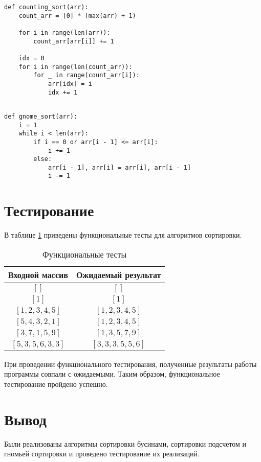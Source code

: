 \begin{center}
\captionsetup{justification=raggedright,singlelinecheck=off}
\begin{lstlisting}[label=lst:counting_sort,caption=Алгоритм сортировки подсчетом]
def counting_sort(arr):
	count_arr = [0] * (max(arr) + 1)
	
	for i in range(len(arr)):
		count_arr[arr[i]] += 1
	
	idx = 0
	for i in range(len(count_arr)):
		for _ in range(count_arr[i]):
			arr[idx] = i
			idx += 1
	    
\end{lstlisting}
\end{center}
\clearpage
\begin{center}
\captionsetup{justification=raggedright,singlelinecheck=off}
\begin{lstlisting}[label=lst:gnome_sort,caption=Алгоритм гномьей сортировки]
def gnome_sort(arr):
	i = 1
	while i < len(arr):
		if i == 0 or arr[i - 1] <= arr[i]:
			i += 1
		else:
			arr[i - 1], arr[i] = arr[i], arr[i - 1]
			i -= 1

\end{lstlisting}
\end{center}

\section{Тестирование}

В таблице \ref{tbl:tests} приведены функциональные тесты для алгоритмов сортировки.

\begin{table}[h]
	\begin{center}
		\caption{\label{tbl:tests} Функциональные тесты}
		\begin{tabular}{|c|c|}
			\hline
			Входной массив & Ожидаемый результат \\ 
			\hline
			$[]$ & $[]$\\ \hline
			$[1]$ & $[1]$\\ \hline
			$[1, 2, 3, 4, 5]$ & $[1, 2, 3, 4, 5]$\\ \hline
			$[5, 4, 3, 2, 1]$ & $[1, 2, 3, 4, 5]$\\ \hline
			$[3, 7, 1, 5, 9]$ & $[1, 3, 5, 7, 9]$\\ \hline
			$[5, 3, 5, 6, 3, 3]$ & $[3, 3, 3, 5, 5, 6]$\\ \hline
		\end{tabular}
	\end{center}
\end{table}

При проведении функционального тестирования, полученные результаты работы программы совпали с ожидаемыми. Таким образом, функциональное тестирование пройдено успешно.

\section*{Вывод}

Были реализованы алгоритмы сортировки бусинами, сортировки подсчетом и гномьей сортировки и проведено тестирование их реализаций.